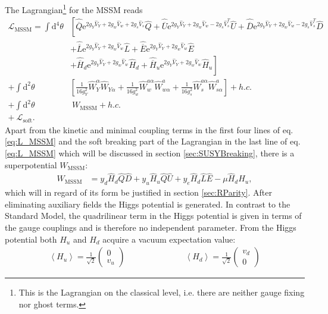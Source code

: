 The Lagrangian\footnote{This is the Lagrangian on the classical level, i.e. there are neither gauge fixing nor ghost terms.} for the MSSM reads
\begin{align}
\mathcal{L}_{\mathrm{MSSM}} = \int \mathrm{d}^4 \theta & \left[ \hat{\overline{Q}}\mathrm{e}^{2g_Y \hat{V}_Y + 2g_w\hat{V}_w + 2g_s\hat{V}_s}\hat{Q} + \hat{\overline{U}}\mathrm{e}^{2g_Y \hat{V}_Y + 2g_w\hat{V}_w - 2g_s\hat{V}^T_s}\hat{U} + \hat{\overline{D}}\mathrm{e}^{2g_Y \hat{V}_Y + 2g_w\hat{V}_w - 2g_s\hat{V}^T_s}\hat{D} \right.\nonumber\\
 & + \hat{\overline{L}}\mathrm{e}^{2g_Y \hat{V}_Y + 2g_w\hat{V}_w}\hat{L} + \hat{\overline{E}}\mathrm{e}^{2g_Y \hat{V}_Y + 2g_w\hat{V}_w}\hat{E}\nonumber\\
 & + \left. \hat{\overline{H}}_d\mathrm{e}^{2g_Y \hat{V}_Y + 2g_w\hat{V}_w}\hat{H}_d + \hat{\overline{H}}_u\mathrm{e}^{2g_Y \hat{V}_Y + 2g_w\hat{V}_w}\hat{H}_u \right]\nonumber\\
 + \int \mathrm{d}^2\theta & \left[ \frac{1}{16g_Y^2} \hat{W}_Y^{\alpha}\hat{W}_{Y\alpha} + \frac{1}{16g_w^{2}} \hat{W}_w^{a\alpha}\hat{W}^a_{w\alpha} + \frac{1}{16g_s^2} \hat{W}_s^{a\alpha}\hat{W}^a_{s\alpha} \right] + h.c.\nonumber\\
 + \int \mathrm{d}^2\theta&\ W_{\mathrm{MSSM}} + h.c.\nonumber\\
 +\  \mathcal{L}_{\mathrm{soft}}.\ &\label{eq:L_MSSM}
\end{align}
Apart from the kinetic and minimal coupling terms in the first four lines of eq. \eqref{eq:L_MSSM} and the soft breaking part of the Lagrangian in the last line of eq. \eqref{eq:L_MSSM} which will be discussed in section \ref{sec:SUSYBreaking}, there is a superpotential $W_{\mathrm{MSSM}}$:
\begin{align}
W_\mathrm{{MSSM}} &= y_d \hat{H}_d \hat{Q} \hat{D} + y_u \hat{H}_u \hat{Q} \hat U + y_e \hat{H}_d \hat{L} \hat{E} - \mu \hat{H}_d \hat{H}_u,\label{eq:W_MSSM}
\end{align}
which will in regard of its form be justified in section \ref{sec:RParity}. After eliminating auxiliary fields the Higgs potential is generated. In contrast to the Standard Model, the quadrilinear term in the Higgs potential is given in terms of the gauge couplings and is therefore no independent parameter. From the Higgs potential both $H_u$ and $H_d$ acquire a vacuum expectation value:
\begin{align}
\left\langle H_u \right\rangle = \frac{1}{\sqrt{2}}\begin{pmatrix}
0 \\ v_u
\end{pmatrix} \hspace{3cm} 
\left\langle H_d \right\rangle = \frac{1}{\sqrt{2}}\begin{pmatrix}
v_d \\ 0
\end{pmatrix}
\end{align}
